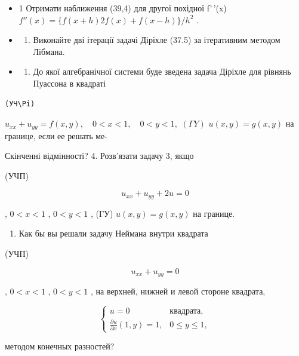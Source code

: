 \documentclass[
  ukrainian,
]{article}
\providecommand{\tightlist}{%
  \setlength{\itemsep}{0pt}\setlength{\parskip}{0pt}}
\begin{document}
\begin{itemize}
\tightlist
\item
  1 Отримати наближення (39,4) для другої похідної f'\,'(x)
  \(f''(x) = \{f(x+h) 2f(x) + f(x-h)\}/h^2\) .
\item
  \begin{enumerate}
  \def\labelenumi{\arabic{enumi}.}
  \setcounter{enumi}{1}
  \tightlist
  \item
    Виконайте дві ітерації задачі Діріхле (37.5) за ітеративним методом
    Лібмана.
  \end{enumerate}
\item
  \begin{enumerate}
  \def\labelenumi{\arabic{enumi}.}
  \setcounter{enumi}{2}
  \tightlist
  \item
    До якої алгебранічної системи буде зведена задача Діріхле для
    рівнянь Пуассона в квадраті
  \end{enumerate}
\end{itemize}

\begin{verbatim}
(УЧ\Pi)
\end{verbatim}

\(u_{xx} + u_{yy} = f(x,y), \quad 0 < x < 1, \quad 0 < y < 1,\)
\((\Gamma Y)\) \(u(x,y) = g(x,y)\) на границе, если ее решать ме-

Скінченні відмінності? 4. Розв'язати задачу 3, якщо

(УЧП)

\[
u_{xx} + u_{yy} + 2u = 0
\]

, \(0 < x < 1\) , \(0 < y < 1\) , (ГУ) \(u(x, y) = g(x, y)\) на границе.

\begin{enumerate}
\def\labelenumi{\arabic{enumi}.}
\setcounter{enumi}{4}
\tightlist
\item
  Как бы вы решали задачу Неймана внутри квадрата
\end{enumerate}

(УЧП)

\[
u_{xx} + u_{yy} = 0
\]

, \(0 < x < 1\) , \(0 < y < 1\) , на верхней, нижней и левой стороне
квадрата,

\[
\begin{cases} u = 0 & \text{квадрата,} \\ \frac{\partial u}{\partial x}(1, y) = 1, & 0 \leqslant y \leqslant 1, \end{cases}
\]

методом конечных разностей?
\end{document}
